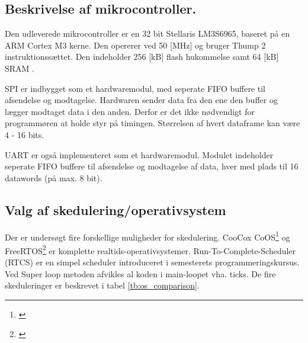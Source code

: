 \subsection{Beskrivelse af mikrocontroller.}
Den udleverede mikrocontroller er en 32 bit Stellaris LM3S6965, baseret på en ARM Cortex M3 kerne. Den opererer ved 50 [MHz] og bruger Thump 2 instruktionssættet. Den indeholder 256 [kB] flash hukommelse samt 64 [kB] SRAM \citep{lm3s6965}.

SPI er indbygget som et hardwaremodul, med seperate FIFO buffere til afsendelse og modtagelse. Hardwaren sender data fra den ene den buffer og lægger modtaget data i den anden. Derfor er det ikke nødvendigt for programmøren at holde styr på timingen. Størrelsen af hvert dataframe kan være 4 - 16 bits. 

UART er også implementeret som et hardwaremodul. Modulet indeholder seperate FIFO buffere til afsendelse og modtagelse af data, hver med plads til 16 datawords (på max. 8 bit). 

\subsection{Valg af skedulering/operativsystem}
Der er undersøgt fire forskellige muligheder for skedulering.
CooCox CoOS\footnote{\citep{www.coocox.com/CoOS.htm}} og FreeRTOS\footnote{\citep{freertos.org}}
er komplette realtids-operativsystemer. 
Run-To-Complete-Scheduler (RTCS) er en simpel scheduler introduceret i semesterets programmeringskursus.
Ved Super loop metoden afvikles al koden i main-loopet vha. ticks.
De fire skeduleringer er beskrevet i tabel \ref{tb:os_comparison}.

